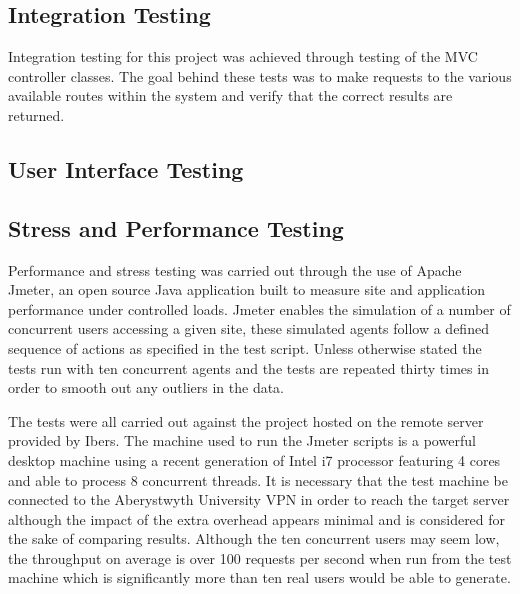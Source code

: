 \subsection{Integration Testing}

Integration testing for this project was achieved through testing of the MVC controller classes. The goal behind these tests was to make requests to the various available routes within the system and verify that the correct results are returned. 


\lstjava



\subsection{User Interface Testing}

\subsection{Stress and Performance Testing}

Performance and stress testing was carried out through the use of Apache Jmeter\cite{_jmeter}, an open source Java application built to measure site and application performance under controlled loads. Jmeter enables the simulation of a number of concurrent users accessing a given site, these simulated agents follow a defined sequence of actions as specified in the test script. Unless otherwise stated the tests run with ten concurrent agents and the tests are repeated thirty times in order to smooth out any outliers in the data.

The tests were all carried out against the project hosted on the remote server provided by Ibers. The machine used to run the Jmeter scripts is a powerful desktop machine using a recent generation of Intel i7 processor featuring 4 cores and able to process 8 concurrent threads. It is necessary that the test machine be connected to the Aberystwyth University VPN in order to reach the target server although the impact of the extra overhead appears minimal and is considered for the sake of comparing results. Although the ten concurrent users may seem low, the throughput on average is over 100 requests per second when run from the test machine which is significantly more than ten real users would be able to generate.

